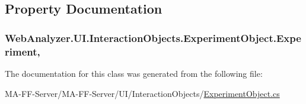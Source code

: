 \subsection{Property Documentation}
\hypertarget{class_web_analyzer_1_1_u_i_1_1_interaction_objects_1_1_experiment_object_a2b87e06b55663703f1017c95c19bfa29}{}
\subsubsection[{Experiment}]{ Web\+Analyzer.\+U\+I.\+Interaction\+Objects.\+Experiment\+Object.\+Experiment\hspace{0.3cm}{\ttfamily [get]}, {\ttfamily [set]}}\label{class_web_analyzer_1_1_u_i_1_1_interaction_objects_1_1_experiment_object_a2b87e06b55663703f1017c95c19bfa29}


The documentation for this class was generated from the following file\+:\begin{DoxyCompactItemize}
\item 
M\+A-\/\+F\+F-\/\+Server/\+M\+A-\/\+F\+F-\/\+Server/\+U\+I/\+Interaction\+Objects/\hyperlink{_experiment_object_8cs}{Experiment\+Object.\+cs}\end{DoxyCompactItemize}
